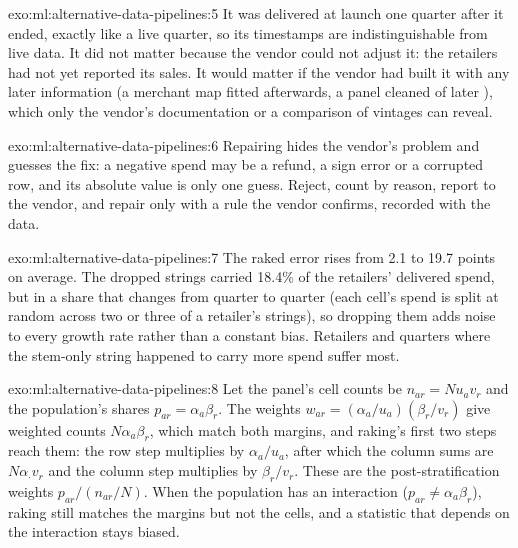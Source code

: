 \begin{solution}{exo:ml:alternative-data-pipelines:5}
It was delivered at launch one quarter after it ended, exactly like a live quarter, so its timestamps are indistinguishable
from live data. It did not matter because the vendor could not adjust it: the retailers had not yet reported its sales. It
would matter if the vendor had built it with any later information (a merchant map fitted afterwards, a panel cleaned of
later ), which only the vendor's documentation or a comparison of vintages can reveal.
\end{solution}

\begin{solution}{exo:ml:alternative-data-pipelines:6}
Repairing hides the vendor's problem and guesses the fix: a negative spend may be a refund, a sign error or a corrupted
row, and its absolute value is only one guess. Reject, count by reason, report to the vendor, and repair only with a rule
the vendor confirms, recorded with the data.
\end{solution}

\begin{solution}{exo:ml:alternative-data-pipelines:7}
The raked error rises from 2.1 to 19.7 points on average. The dropped strings carried 18.4\% of the retailers' delivered
spend, but in a share that changes from quarter to quarter (each cell's spend is split at random across two or three of a
retailer's strings), so dropping them adds noise to every growth rate rather than a constant bias. Retailers and quarters
where the stem-only string happened to carry more spend suffer most.
\end{solution}

\begin{solution}{exo:ml:alternative-data-pipelines:8}
Let the panel's cell counts be $n_{ar} = N u_a v_r$ and the population's shares $p_{ar} = \alpha_a\beta_r$. The weights
$w_{ar} = (\alpha_a/u_a)(\beta_r/v_r)$ give weighted counts $N\alpha_a\beta_r$, which match both margins, and raking's first
two steps reach them: the row step multiplies by $\alpha_a/u_a$, after which the column sums are $N\alpha_\cdot v_r$ and the
column step multiplies by $\beta_r/v_r$. These are the post-stratification weights $p_{ar}/(n_{ar}/N)$. When the population
has an interaction ($p_{ar}\ne\alpha_a\beta_r$), raking still matches the margins but not the cells, and a statistic that
depends on the interaction stays biased.
\end{solution}

